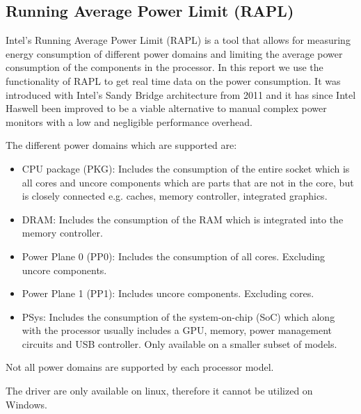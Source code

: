 \subsection{Running Average Power Limit (RAPL)}
Intel's Running Average Power Limit (RAPL) is a tool that allows for measuring energy consumption of different power domains and limiting the average power consumption of the components in the processor. In this report we use the functionality of RAPL to get real time data on the power consumption. It was introduced with Intel’s Sandy Bridge architecture from 2011 and it has since Intel Haswell been improved to be a viable alternative to manual complex power monitors with a low and negligible performance overhead. \cite{RAPL_in_action}

The different power domains which are supported are:
\begin{itemize}
    \item CPU package (PKG): Includes the consumption of the entire socket which is all cores and uncore components which are parts that are not in the core, but is closely connected e.g. caches, memory controller, integrated graphics.
    \item DRAM: Includes the consumption of the RAM which is integrated into the memory controller.  
    \item Power Plane 0 (PP0): Includes the consumption of all cores. Excluding uncore components.
    \item Power Plane 1 (PP1): Includes uncore components. Excluding cores.
    \item PSys: Includes the consumption of the system-on-chip (SoC) which along with the processor usually includes a GPU, memory, power management circuits and USB controller. Only available on a smaller subset of models.
\end{itemize}
Not all power domains are supported by each processor model.

The driver are only available on linux, therefore it cannot be utilized on Windows. 